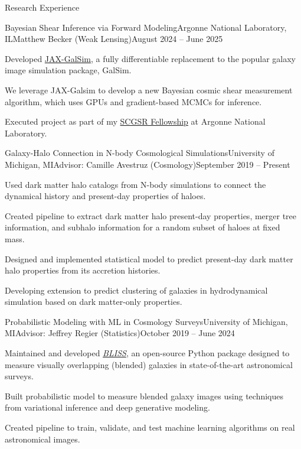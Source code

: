 \documentclass{resume} %
\begin{document}
\begin{rSection}{Research Experience}

\begin{rSubsection}{Bayesian Shear Inference via Forward Modeling}{Argonne National Laboratory, IL}{Matthew Becker (Weak Lensing)}{August 2024 -- June 2025}
\item Developed \href{https://github.com/GalSim-developers/JAX-GalSim}{JAX-GalSim}, a fully differentiable replacement to the popular galaxy image simulation package, GalSim. 
\item We leverage JAX-Galsim to develop a new Bayesian cosmic shear measurement algorithm, which uses GPUs and gradient-based MCMCs for inference.
\item Executed project as part of my \href{https://science.osti.gov/wdts/scgsr}{SCGSR Fellowship} at Argonne National Laboratory.
\end{rSubsection}

\begin{rSubsection}{Galaxy-Halo Connection in N-body Cosmological Simulations}{University of Michigan, MI}{Advisor: Camille Avestruz (Cosmology)}{September 2019 -- Present}
\item Used dark matter halo catalogs from N-body simulations to connect the dynamical history and present-day properties of haloes.
\item Created pipeline to extract dark matter halo present-day properties, merger tree information, and subhalo information for a random subset of haloes at fixed mass.
\item Designed and implemented statistical model to predict present-day dark matter halo properties from its accretion histories.
\item Developing extension to predict clustering of galaxies in hydrodynamical simulation based on dark matter-only properties. 
\end{rSubsection}

\begin{rSubsection}{Probabilistic Modeling with ML in Cosmology Surveys}{University of Michigan, MI}{Advisor: Jeffrey Regier (Statistics)}{October 2019 -- June 2024}
\item Maintained and developed \textit{\href{https://github.com/prob-ml/bliss}{BLISS}}, an open-source Python package designed to measure visually overlapping (blended) galaxies in state-of-the-art astronomical surveys.
\item Built probabilistic model to measure blended galaxy images using techniques from variational inference and deep generative modeling.
\item Created pipeline to train, validate, and test machine learning algorithms on real astronomical images.
\end{rSubsection}


\end{rSection}
\end{document}
